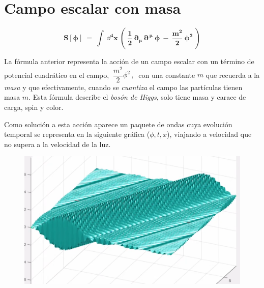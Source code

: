 \chapter{Campo escalar con masa}
\label{campo-escalar-con-masa}



\vspace{10mm}
\begin{adjustwidth}{50pt}{50pt}
\begin{ejemplo}

$$\boldsymbol{ S[\phi] \ = \ \displaystyle \int \ \dd^4 x \ \left( \ \dfrac 1 2 \ \partial_\mu \ \partial^{\, \mu} \ \phi \ - \ \dfrac{m^2}{2} \ \phi^2 \ \right) }$$ 

La fórmula anterior representa la acción de un campo escalar con un término de potencial cuadrático en el campo, $ \ \dfrac{m^2}{2}\phi^2 \, , \  $ con una constante $m$ que recuerda a la \emph{masa} y que efectivamente, cuando se \emph{cuantiza} el campo las partículas tienen masa $m$. Esta fórmula describe el \emph{bosón de Higgs}, solo tiene masa y carace de carga, spin y color.

Como solución a esta acción aparece un paquete de ondas cuya evolución temporal se representa en la siguiente gráfica ($\phi,t,x$), viajando a velocidad que no supera a la velocidad de la luz.

\begin{figure}[H]
	\centering
	\includegraphics[width=.75\textwidth]{imagenes/img33-01.png}
\end{figure}

\vspace{3mm}
\end{ejemplo}
\end{adjustwidth}
\vspace{5mm}

